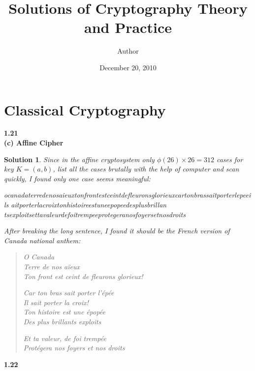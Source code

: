 \documentclass[12pt,a4paper]{article}
\theoremstyle{solution}
\newtheorem*{sol}{Solution}
\begin{document}
\title{Solutions of Cryptography Theory and Practice}
\author{Author}
\date{December 20, 2010}


\maketitle

\section{Classical Cryptography}

\textbf{1.21 \\[0.4ex] (c) Affine Cipher}

\begin{sol}
Since in the affine cryptosystem only $\phi(26) \times 26 =312$ cases for key $K=(a,b)$, list all the cases brutally with the help of computer and scan quickly, I found only one case seems meaningful:

\textup{ocanadaterredenosaieuxtonfrontestceintdefleuronsglorieuxcartonbrassaitporterlepeeils aitporterlacroixtonhistoireestuneepopeedesplusbrillan
tsexploitsettavaleurdefoitrempeeprotegeranosfoyersetnosdroits}

After breaking the long sentence, I found it should be the French version of Canada national anthem:
\begin{verse}
O Canada \\
Terre de nos a\"{i}eux\\
Ton front est ceint de fleurons glorieux!

Car ton bras sait porter l'\'{e}p\'{e}e  \\
Il sait porter la croix!  \\
Ton histoire est une \'{e}pop\'{e}e  \\
Des plus brillants exploits

Et ta valeur, de foi tremp\'{e}e \\
Prot\'{e}gera nos foyers et nos droits
\end{verse}
\end{sol}

\textbf{1.22 }
\end{document}
